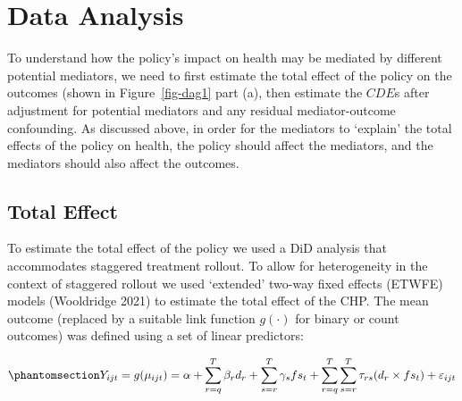 \documentclass[
  letterpaper,
  DIV=11,
  numbers=noendperiod]{scrartcl}
\begin{document}
\section{Data Analysis}\label{data-analysis}

To understand how the policy's impact on health may be mediated by
different potential mediators, we need to first estimate the total
effect of the policy on the outcomes (shown in Figure~\ref{fig-dag1}
part (a), then estimate the \(CDE\)s after adjustment for potential
mediators and any residual mediator-outcome confounding. As discussed
above, in order for the mediators to `explain' the total effects of the
policy on health, the policy should affect the mediators, and the
mediators should also affect the outcomes.

\subsection{Total Effect}\label{total-effect}

To estimate the total effect of the policy we used a DiD analysis that
accommodates staggered treatment rollout. To allow for heterogeneity in
the context of staggered rollout we used `extended' two-way fixed
effects (ETWFE) models (Wooldridge 2021) to estimate the total effect of
the CHP. The mean outcome (replaced by a suitable link function
\(g(\cdot)\) for binary or count outcomes) was defined using a set of
linear predictors:

\begin{equation}\phantomsection\label{eq-etwfe}{Y_{ijt}=g(\mu_{ijt}) = \alpha + \sum_{r=q}^{T} \beta_{r} d_{r} + \sum_{s=r}^{T} \gamma_{s} fs_{t}+ \sum_{r=q}^{T} \sum_{s=r}^{T} \tau_{rs} (d_{r} \times fs_{t}) + \varepsilon_{ijt}}\end{equation}
\end{document}
